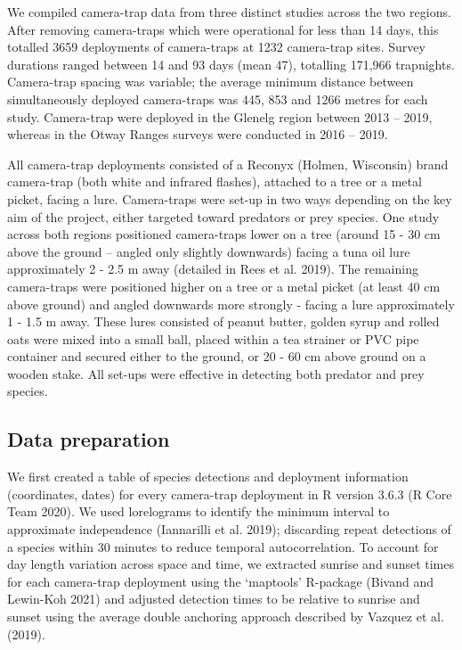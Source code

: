 \documentclass[]{elsarticle} %
\begin{document}
We compiled camera-trap data from three distinct studies across the two regions. After removing camera-traps which were operational for less than 14 days, this totalled 3659 deployments of camera-traps at 1232 camera-trap sites. Survey durations ranged between 14 and 93 days (mean 47), totalling 171,966 trapnights. Camera-trap spacing was variable; the average minimum distance between simultaneously deployed camera-traps was 445, 853 and 1266 metres for each study. Camera-trap were deployed in the Glenelg region between 2013 -- 2019, whereas in the Otway Ranges surveys were conducted in 2016 -- 2019.

All camera-trap deployments consisted of a Reconyx (Holmen, Wisconsin) brand camera-trap (both white and infrared flashes), attached to a tree or a metal picket, facing a lure. Camera-traps were set-up in two ways depending on the key aim of the project, either targeted toward predators or prey species. One study across both regions positioned camera-traps lower on a tree (around 15 - 30 cm above the ground -- angled only slightly downwards) facing a tuna oil lure approximately 2 - 2.5 m away (detailed in Rees et al. 2019). The remaining camera-traps were positioned higher on a tree or a metal picket (at least 40 cm above ground) and angled downwards more strongly - facing a lure approximately 1 - 1.5 m away. These lures consisted of peanut butter, golden syrup and rolled oats were mixed into a small ball, placed within a tea strainer or PVC pipe container and secured either to the ground, or 20 - 60 cm above ground on a wooden stake. All set-ups were effective in detecting both predator and prey species.

\hypertarget{data-preparation}{%
\subsection{Data preparation}\label{data-preparation}}

We first created a table of species detections and deployment information (coordinates, dates) for every camera-trap deployment in R version 3.6.3 (R Core Team 2020).
We used lorelograms to identify the minimum interval to approximate independence (Iannarilli et al. 2019); discarding repeat detections of a species within 30 minutes to reduce temporal autocorrelation. To account for day length variation across space and time, we extracted sunrise and sunset times for each camera-trap deployment using the `maptools' R-package (Bivand and Lewin-Koh 2021) and adjusted detection times to be relative to sunrise and sunset using the average double anchoring approach described by Vazquez et al. (2019).
\end{document}
